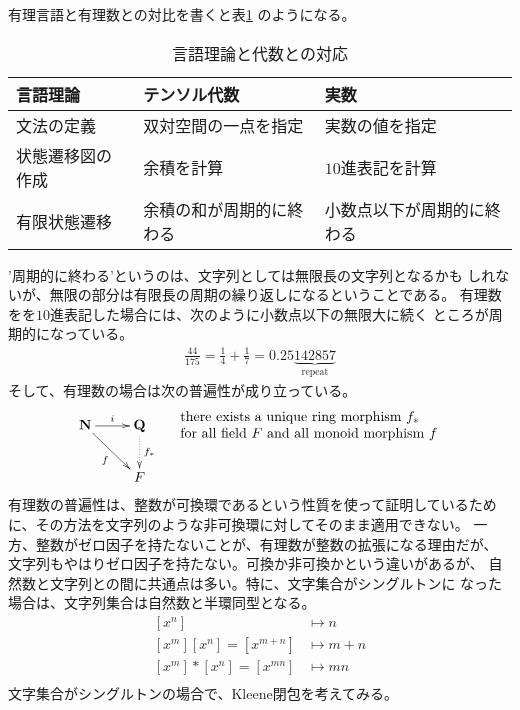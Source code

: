 	有理言語と有理数との対比を書くと表\ref{tab:言語理論と代数との対応}
	のようになる。
	\begin{table}[htbp] %
		\begin{center}\begin{tabular}{lll} \hline
			言語理論 & テンソル代数 & 実数 \\ \hline
			文法の定義 & 双対空間の一点を指定 & 実数の値を指定 \\
			状態遷移図の作成 & 余積を計算 & $10$進表記を計算 \\
			有限状態遷移 & 余積の和が周期的に終わる 
				& 小数点以下が周期的に終わる \\
		\end{tabular}\end{center}
		\caption{言語理論と代数との対応}
		\label{tab:言語理論と代数との対応}
	\end{table} %
	’周期的に終わる’というのは、文字列としては無限長の文字列となるかも
	しれないが、無限の部分は有限長の周期の繰り返しになるということである。
	有理数をを$10$進表記した場合には、次のように小数点以下の無限大に続く
	ところが周期的になっている。
	\begin{equation*}\begin{split}
		\frac{44}{175} = \frac{1}{4} + \frac{1}{7} 
		= 0.25\underbrace{142857}_{\text{repeat}}
	\end{split}\end{equation*}
	そして、有理数の場合は次の普遍性が成り立っている。
	\begin{equation*}\begin{split}
		\xymatrix{
			\sizen \ar[rd]_{f} \ar[r]^{i} & \bun \ar@{.>}[d]^{f_*} \\
			& F \\
		}\quad\begin{array}{l}
			\text{there exists a unique ring morphism } f_* \\
			\text{for all field } F \text{ and all monoid morphism } f
		\end{array}
	\end{split}\end{equation*}
	有理数の普遍性は、整数が可換環であるという性質を使って証明しているため
	に、その方法を文字列のような非可換環に対してそのまま適用できない。
	一方、整数がゼロ因子を持たないことが、有理数が整数の拡張になる理由だが、
	文字列もやはりゼロ因子を持たない。可換か非可換かという違いがあるが、
	自然数と文字列との間に共通点は多い。特に、文字集合がシングルトンに
	なった場合は、文字列集合は自然数と半環同型となる。
	\begin{equation*}\begin{split}
		[x^n] &\mapsto n \\
		[x^m][x^n] = [x^{m + n}] &\mapsto m + n \\
		[x^m]*[x^n] = [x^{mn}] &\mapsto mn \\
	\end{split}\end{equation*}
	文字集合がシングルトンの場合で、Kleene閉包を考えてみる。

